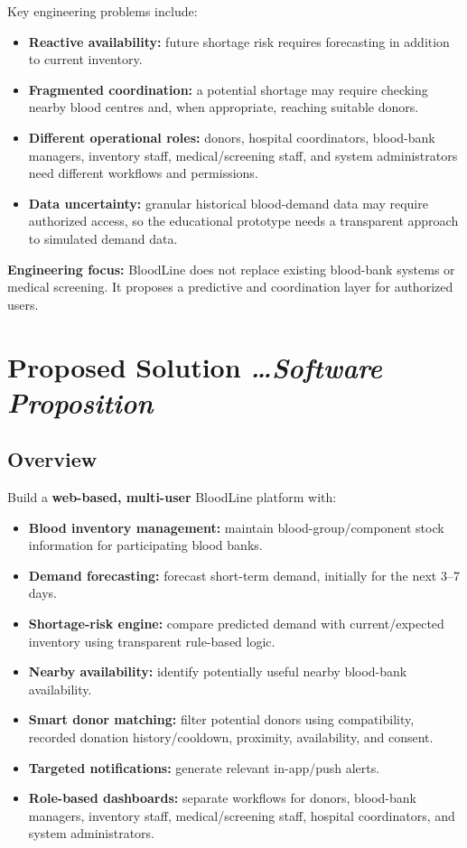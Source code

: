 \documentclass[11pt,a4paper]{article}
\newcommand{\BvrHint}[1]{{\normalfont\normalsize\itshape\hfill #1}}
\begin{document}
Key engineering problems include:
\begin{itemize}[leftmargin=0.7cm]
\item \textbf{Reactive availability:} future shortage risk requires forecasting in addition to current inventory.
\item \textbf{Fragmented coordination:} a potential shortage may require checking nearby blood centres and, when appropriate, reaching suitable donors.
\item \textbf{Different operational roles:} donors, hospital coordinators, blood-bank managers, inventory staff, medical/screening staff, and system administrators need different workflows and permissions.
\item \textbf{Data uncertainty:} granular historical blood-demand data may require authorized access, so the educational prototype needs a transparent approach to simulated demand data.
\end{itemize}

\textbf{Engineering focus:} BloodLine does not replace existing blood-bank systems or medical screening. It proposes a predictive and coordination layer for authorized users.

\section{Proposed Solution \BvrHint{\ldots Software Proposition}}
\subsection{Overview}
Build a \textbf{web-based, multi-user} BloodLine platform with:
\begin{itemize}[leftmargin=0.7cm]
\item \textbf{Blood inventory management:} maintain blood-group/component stock information for participating blood banks.
\item \textbf{Demand forecasting:} forecast short-term demand, initially for the next 3--7 days.
\item \textbf{Shortage-risk engine:} compare predicted demand with current/expected inventory using transparent rule-based logic.
\item \textbf{Nearby availability:} identify potentially useful nearby blood-bank availability.
\item \textbf{Smart donor matching:} filter potential donors using compatibility, recorded donation history/cooldown, proximity, availability, and consent.
\item \textbf{Targeted notifications:} generate relevant in-app/push alerts.
\item \textbf{Role-based dashboards:} separate workflows for donors, blood-bank managers, inventory staff, medical/screening staff, hospital coordinators, and system administrators.
\end{itemize}
\end{document}
